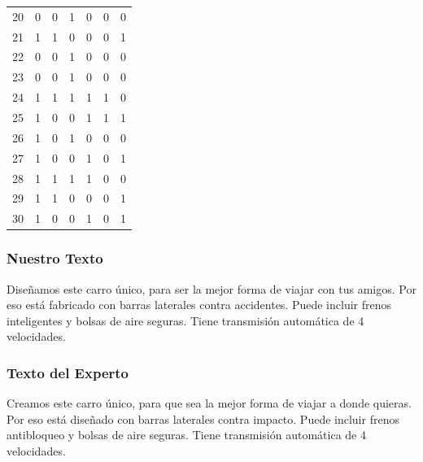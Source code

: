 \begin{table}
\begin{tabular}{|r|c|c|c|c|c|c|}
20 &         0 &         0 &         1 &         0 &         0 &         0 \\
21 &         1 &         1 &         0 &         0 &         0 &         1 \\
22 &         0 &         0 &         1 &         0 &         0 &         0 \\
23 &         0 &         0 &         1 &         0 &         0 &         0 \\
24 &         1 &         1 &         1 &         1 &         1 &         0 \\
25 &         1 &         0 &         0 &         1 &         1 &         1 \\
26 &         1 &         0 &         1 &         0 &         0 &         0 \\
27 &         1 &         0 &         0 &         1 &         0 &         1 \\
28 &         1 &         1 &         1 &         1 &         0 &         0 \\
29 &         1 &         1 &         0 &         0 &         0 &         1 \\
30 &         1 &         0 &         0 &         1 &         0 &         1 

\end{tabular}
\end{table}



\subsubsection{Nuestro Texto}

Diseñamos este carro único, para ser la mejor forma de viajar con tus amigos. Por eso está fabricado con barras laterales contra accidentes. Puede incluir frenos inteligentes y bolsas de aire seguras. Tiene transmisión automática de 4 velocidades.

\subsubsection{Texto del Experto}

Creamos este carro único, para que sea la mejor forma de viajar a donde quieras. Por eso está diseñado con barras laterales contra impacto. Puede incluir frenos antibloqueo y bolsas de aire seguras. Tiene transmisión automática de 4 velocidades.

